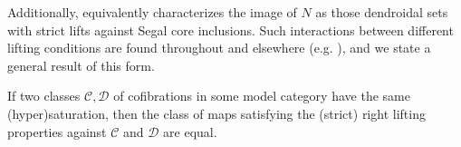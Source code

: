 \documentclass[a4paper,10pt
,draft
]{article}%
\begin{document}
Additionally, \cite[Cor. 2.6]{CM13a} equivalently characterizes the image of $N$ as those dendroidal sets with
strict lifts against Segal core inclusions.
Such interactions between different lifting conditions are found throughout \cite[\S 2]{CM13a} and elsewhere (e.g. \cite[Lemma 3.5]{JT06}),
and we state a general result of this form.
\begin{lemma}\label{HYPER_LP_LEM}
	If two classes $\mathcal{C},\mathcal{D}$
	of cofibrations in some model category %
	have the same (hyper)saturation, then
        the class of maps satisfying the (strict) right lifting properties against $\mathcal C$ and $\mathcal D$ are equal.
\end{lemma}
\end{document}
